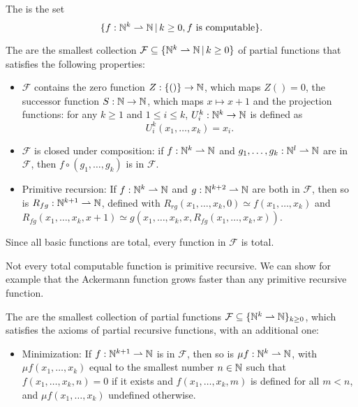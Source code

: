 
\begin{definition}
  The  is the set
  \[
	\{f: \mathbb{N}^k \rightharpoonup \mathbb{N} \,|\, k \ge 0, \text{$f$ is computable}\}.
  \]
\end{definition}

\begin{definition}
  The  are the smallest collection
  $\mathcal{F} \subseteq \{\mathbb{N}^k \rightharpoonup \mathbb{N} \,|\, k \ge 0\}$ of partial
  functions that satisfies the following properties:
  \begin{itemize}
  \item $\mathcal{F}$ contains the zero function $Z: \{()\} \to \mathbb{N}$,
	which maps $Z() = 0$, the successor function $S: \mathbb{N} \to \mathbb{N}$, which maps $x
	\mapsto x+1$ and the projection functions:
	for any $k \ge 1$ and $1 \le i \le k$, $U_i^k: \mathbb{N}^k \to \mathbb{N}$ is defined as
	\[
	  U_i^k(x_1, \ldots, x_k) = x_i.
	\]
  \item $\mathcal{F}$ is closed under composition: if $f: \mathbb{N}^k \rightharpoonup
	\mathbb{N}$ and $g_1, \ldots, g_k: \mathbb{N}^l \rightharpoonup \mathbb{N}$ are in $\mathcal{F}$,
	then $f \circ (g_1, \ldots, g_k)$ is in $\mathcal{F}$.
  \item Primitive recursion: If $f: \mathbb{N}^k \rightharpoonup \mathbb{N}$ and $g: \mathbb{N}^{k+2}
	\rightharpoonup \mathbb{N}$ are both in $\mathcal{F}$, then so is $R_{fg}: \mathbb{N}^{k+1}
	\rightharpoonup \mathbb{N}$, defined with $R_{rg}(x_1, \ldots, x_k, 0) \simeq f(x_1,
	\ldots, x_k)$ and $R_{fg}(x_1, \ldots, x_k, x+1) \simeq g(x_1, \ldots, x_k,
	x, R_{fg}(x_1, \ldots, x_k, x))$.
  \end{itemize}
\end{definition}

\begin{remark}
  Since all basic functions are total, every function in $\mathcal{F}$ is total.
\end{remark}

\begin{remark}
  Not every total computable function is primitive recursive.
  We can show for example that the Ackermann function grows faster than any
  primitive recursive function.
\end{remark}

\begin{definition}
  The  are the smallest collection of partial
  functions $\mathcal{F} \subseteq \{\mathbb{N}^k \rightharpoonup \mathbb{N}\}_{k \ge 0}$, which
  satisfies the axioms of partial recursive functions, with an additional one:
  \begin{itemize}
  \item Minimization: If $f: \mathbb{N}^{k+1} \rightharpoonup \mathbb{N}$ is in $\mathcal{F}$,
	then so is $\mu f: \mathbb{N}^k \rightharpoonup \mathbb{N}$, with $\mu f(x_1, \ldots,
	x_k)$ equal to the smallest number $n \in \mathbb{N}$ such that $f(x_1, \ldots, x_k,
	n) = 0$ if it exists and $f(x_1, \ldots, x_k, m)$ is defined for all $m <
	n$, and $\mu f(x_1, \ldots, x_k)$ undefined otherwise.
  \end{itemize}
\end{definition}

